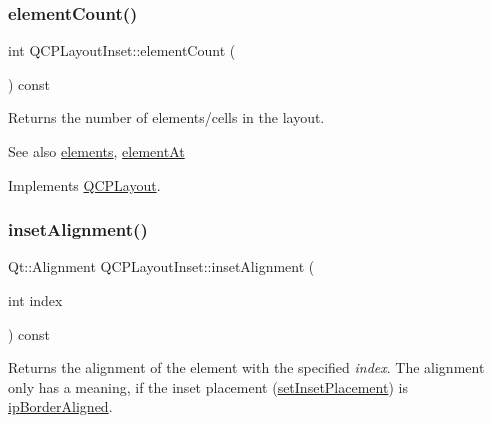 \subsubsection{\texorpdfstring{element\+Count()}{elementCount()}}
{\footnotesize\ttfamily int Q\+C\+P\+Layout\+Inset\+::element\+Count (\begin{DoxyParamCaption}{ }\end{DoxyParamCaption}) const\hspace{0.3cm}{\ttfamily [virtual]}}

Returns the number of elements/cells in the layout.

\begin{DoxySeeAlso}{See also}
\hyperlink{class_q_c_p_layout_aca129722c019f91d3367046f80abfa77}{elements}, \hyperlink{class_q_c_p_layout_inset_a881ca205605bae9c034733b808f93a02}{element\+At} 
\end{DoxySeeAlso}


Implements \hyperlink{class_q_c_p_layout_a39d3e9ef5d9b82ab1885ba1cb9597e56}{Q\+C\+P\+Layout}.

\mbox{\label{class_q_c_p_layout_inset_a5b33b66f0abbb4a7cc2f8aa6c94cf7f8}} 
\subsubsection{\texorpdfstring{inset\+Alignment()}{insetAlignment()}}
{\footnotesize\ttfamily Qt\+::\+Alignment Q\+C\+P\+Layout\+Inset\+::inset\+Alignment (\begin{DoxyParamCaption}\item[{int}]{index }\end{DoxyParamCaption}) const}

Returns the alignment of the element with the specified {\itshape index}. The alignment only has a meaning, if the inset placement (\hyperlink{class_q_c_p_layout_inset_a63298830744d5d8c5345511c00fd2144}{set\+Inset\+Placement}) is \hyperlink{class_q_c_p_layout_inset_a8b9e17d9a2768293d2a7d72f5e298192aa81e7df4a785ddee2229a8f47c46e817}{ip\+Border\+Aligned}. \mbox{\label{class_q_c_p_layout_inset_a6fcbd74ebbc45bfe64c604b2791aa57f}} 
